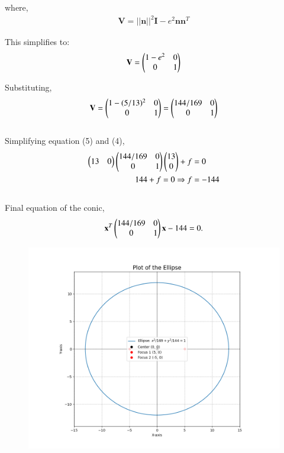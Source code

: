 \documentclass[journal]{IEEEtran}
\begin{document}
where,
\begin{align}
    \mathbf{V} = ||\mathbf{n}||^2 \mathbf{I} - e^2\mathbf{n}\mathbf{n}^T
\end{align}

This simplifies to:
\begin{align}
    \mathbf{V} = \begin{pmatrix}1-e^2 & 0 \\ 0 & 1\end{pmatrix}
\end{align}

Substituting,
\begin{align}
    \mathbf{V} = \begin{pmatrix}1 - (5/13)^2 & 0 \\ 0 & 1\end{pmatrix} = \begin{pmatrix}144/169 & 0 \\ 0 & 1\end{pmatrix}
\end{align}
\\


Simplifying equation (5) and (4),
\begin{align}
    \begin{pmatrix}13 & 0\end{pmatrix} \begin{pmatrix}144/169 & 0 \\ 0 & 1\end{pmatrix} \begin{pmatrix}13 \\ 0\end{pmatrix} + f &= 0 \nonumber \\
    144 + f = 0 \Rightarrow f &= -144
\end{align}
\\


Final equation of the conic,
\begin{align*}
\mathbf{x}^T \begin{pmatrix}144/169 & 0 \\ 0 & 1\end{pmatrix} \mathbf{x} - 144 = 0.
\end{align*}
\begin{figure}[h!]
\begin{center}
\includegraphics[width=\columnwidth]{figs/fig3.png}
\end{center}
\label{fig:Fig.1}
\end{figure}
\end{document}

